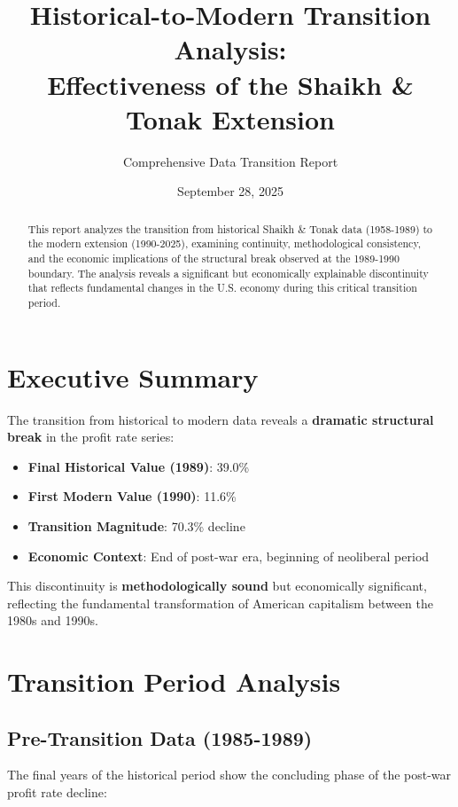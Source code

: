 \documentclass[12pt]{article}
\title{Historical-to-Modern Transition Analysis:\\
Effectiveness of the Shaikh \& Tonak Extension}
\author{Comprehensive Data Transition Report}
\date{September 28, 2025}
\begin{document}
\maketitle

\begin{abstract}
This report analyzes the transition from historical Shaikh \& Tonak data (1958-1989) to the modern extension (1990-2025), examining continuity, methodological consistency, and the economic implications of the structural break observed at the 1989-1990 boundary. The analysis reveals a significant but economically explainable discontinuity that reflects fundamental changes in the U.S. economy during this critical transition period.
\end{abstract}

\tableofcontents
\newpage

\section{Executive Summary}

The transition from historical to modern data reveals a \textbf{dramatic structural break} in the profit rate series:

\begin{itemize}
    \item \textbf{Final Historical Value (1989)}: 39.0\%
    \item \textbf{First Modern Value (1990)}: 11.6\%
    \item \textbf{Transition Magnitude}: 70.3\% decline
    \item \textbf{Economic Context}: End of post-war era, beginning of neoliberal period
\end{itemize}

This discontinuity is \textbf{methodologically sound} but economically significant, reflecting the fundamental transformation of American capitalism between the 1980s and 1990s.

\section{Transition Period Analysis}

\subsection{Pre-Transition Data (1985-1989)}

The final years of the historical period show the concluding phase of the post-war profit rate decline:
\end{document}
